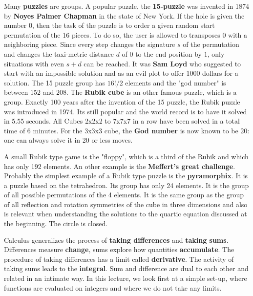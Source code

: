 \documentclass[12pt]{amsart}
\def\chapter#1{ \vspace{2mm} \begin{center} \fcolorbox{green1}{green1}{ \parbox{16.2cm}{{\Large {\bf #1}}}} \vspace{2mm} \end{center} }
\newcounter{example}    \def\example#1{ \item \fontsize{12}{15} \selectfont #1 \fontsize{12}{15} \selectfont }
\begin{document}
Many {\bf puzzles} are groups. A popular puzzle, the {\bf 15-puzzle}
was invented in 1874 by {\bf Noyes Palmer Chapman} in the state of New York. 
If the hole is given the number $0$, then the task of the puzzle is to order a given 
random start permutation of the 16 pieces. 
To do so, the user is allowed to transposes $0$ with a neighboring piece. Since every 
step changes the signature $s$ of the permutation and changes the taxi-metric 
distance $d$ of $0$ to the end position by $1$, only situations with even $s+d$ can 
be reached. It was {\bf Sam Loyd} who suggested to start with an impossible
solution and as an evil plot to offer 1000 dollars for a solution. 
The 15 puzzle group has $16!/2$ elements and the "god number" is between $152$ and $208$. 
The {\bf Rubik cube} is an other famous puzzle, which is a group.
Exactly 100 years after the invention of the 15 puzzle, the Rubik puzzle was 
introduced in 1974. Its still popular and the world record is to have it solved in 
5.55 seconds. All Cubes 2x2x2 to 7x7x7 in a row have been solved in a total time of 6 minutes.
For the 3x3x3 cube, the {\bf God number} is now known to be 20: one can always solve it in 
20 or less moves. 

\begin{center}  \end{center}

A small Rubik type game is the "floppy", which is a third of the Rubik and which has only 192 elements. 
An other example is the {\bf Meffert's great challenge}. 
Probably the simplest example of a Rubik type puzzle is the {\bf pyramorphix}. 
It is a puzzle based on the tetrahedron. Its group has only 24 elements.
It is the group of all possible permutations of the 4 elements. 
It is the same group as the group of all reflection and rotation symmetries of 
the cube in three dimensions and also is relevant when understanding 
the solutions to the quartic equation discussed at the beginning. The circle is closed.


 \pagebreak
{}

\chapter{Lecture 6: Calculus}

Calculus generalizes the process of {\bf taking differences} and {\bf taking sums}. 
Differences measure {\bf change}, sums explore how quantities
{\bf accumulate}. The procedure of taking differences has a limit called {\bf derivative}. The 
activity of taking sums leads to the {\bf integral}. Sum and difference are dual to each other 
and related in an intimate way. In this lecture, we look first at a simple 
set-up,  where functions are evaluated on integers and where we do not take any limits.
\end{document}
